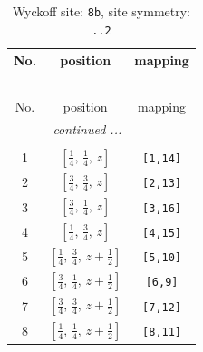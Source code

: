 \documentclass[fleqn,8pt]{jsarticle}
\begin{document}
\begin{longtable}{ccc}
\caption{Wyckoff site: {\tt 8b}, site symmetry: {\tt ..2}}
 \\
 \hline \hline
No. & position & mapping \\ \hline \endfirsthead

\multicolumn{2}{l}{\tablename\ \thetable{}} \\
 \hline \hline
No. & position & mapping \\ \hline \endhead

 \hline \hline
\multicolumn{2}{r}{\footnotesize\it continued ...} \\ \endfoot

 \hline \hline
\multicolumn{2}{r}{} \\ \endlastfoot

1 & $\left[ \frac{1}{4},\, \frac{1}{4},\, z \right]$ & {\tt [1,14]} \\ \hline
2 & $\left[ \frac{3}{4},\, \frac{3}{4},\, z \right]$ & {\tt [2,13]} \\ \hline
3 & $\left[ \frac{3}{4},\, \frac{1}{4},\, z \right]$ & {\tt [3,16]} \\ \hline
4 & $\left[ \frac{1}{4},\, \frac{3}{4},\, z \right]$ & {\tt [4,15]} \\ \hline
5 & $\left[ \frac{1}{4},\, \frac{3}{4},\, z + \frac{1}{2} \right]$ & {\tt [5,10]} \\ \hline
6 & $\left[ \frac{3}{4},\, \frac{1}{4},\, z + \frac{1}{2} \right]$ & {\tt [6,9]} \\ \hline
7 & $\left[ \frac{3}{4},\, \frac{3}{4},\, z + \frac{1}{2} \right]$ & {\tt [7,12]} \\ \hline
8 & $\left[ \frac{1}{4},\, \frac{1}{4},\, z + \frac{1}{2} \right]$ & {\tt [8,11]} \\
\end{longtable}
\renewcommand{\arraystretch}{1.2}
\end{document}
